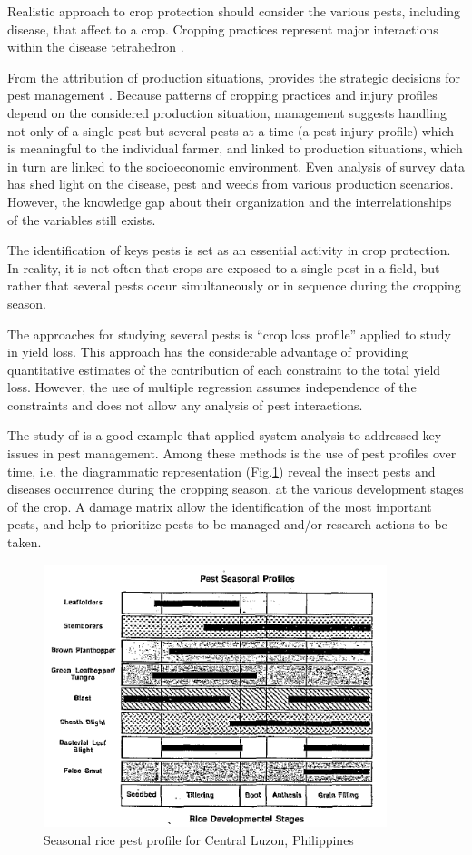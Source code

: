 Realistic approach to crop protection should consider the various pests, including disease, that affect to a crop. Cropping practices represent major interactions within the disease tetrahedron \cite{Zadoks:1979ts}.

From the attribution of production situations, provides the strategic decisions for pest management \cite{Mew:2004kh}. Because patterns of cropping practices and injury profiles depend on the considered production situation, management suggests handling not only of a single pest but several pests at a time (a pest injury profile) which is meaningful to the individual farmer, and linked to production situations, which in turn are linked to the socioeconomic environment. 
Even analysis of survey data has shed light on the disease, pest and weeds from various production scenarios. However, the knowledge gap about their organization and the interrelationships of the variables still exists.

The identification of keys pests is set as an essential activity in crop protection. In reality, it is not often that crops are exposed to a single pest in a field, but rather that several pests occur simultaneously or in sequence during the cropping season. 

The approaches for studying several pests is ``crop loss profile'' applied to study in yield loss. This approach has the considerable advantage of providing quantitative estimates of the contribution of each constraint to the total yield loss. However, the use of multiple regression assumes independence of the constraints and does not allow any analysis of pest interactions.

The study of \citet{heong1985systems} is a good example that applied system analysis to addressed key issues in pest management. Among these methods is the use of pest profiles over time, i.e. the diagrammatic representation (Fig.\ref{fig:pest_season_profile}) reveal the insect pests and diseases occurrence during the cropping season, at the various development stages of the crop. A damage matrix allow the identification of the most important pests, and help to prioritize pests to be managed and/or research actions to be taken. 


\begin{figure}
\includegraphics[width=10cm]{pest_season_profile}
\centering
\caption{Seasonal rice pest profile for Central Luzon, Philippines \cite{heong1985systems}}
\label{fig:pest_season_profile}
\end{figure}

